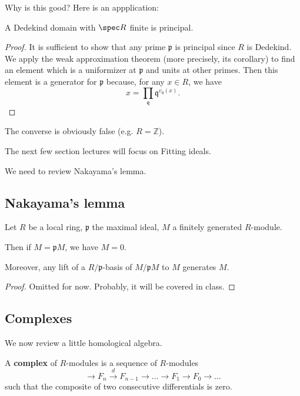 Why is this good? Here is an appplication:
\begin{theorem} 
A Dedekind domain with $\spec R$ finite is principal.
\end{theorem} 
\begin{proof} 
It is sufficient to show that any prime $\mathfrak{p}$ is principal since $R$
is Dedekind. We apply the weak approximation theorem (more precisely, its
corollary) to find an element which
is a uniformizer at $\mathfrak{p}$ and units at other primes. Then this element
is a generator for $\mathfrak{p}$ because, for any $x \in R$, we have
\[ x = \prod_{\mathfrak{q}} \mathfrak{q}^{v_{\mathfrak{q}}(x)}.  \]
\end{proof} 
The converse is obviously false (e.g.  $R  = \mathbb{Z}$).




The next few section lectures will focus on Fitting ideals.

We  need to review Nakayama's lemma.

\subsection{Nakayama's lemma}

\begin{lemma}[Nakayama] Let $R$ be a local ring, $\mathfrak{p}$ the maximal
ideal, $M$ a finitely generated $R$-module.

Then if $M = \mathfrak{p}M$, we have $M = 0$.

Moreover, any lift of a $R/\mathfrak{p}$-basis of $M/\mathfrak{p}M$ to $M$
generates $M$.
\end{lemma} 

\begin{proof} 
Omitted for now. Probably, it will be covered in class.
\end{proof} 

\subsection{Complexes}

We now review  a little homological algebra.

\begin{definition} 
A \textbf{complex} of $R$-modules is a sequence of $R$-modules
\[ \to F_n \stackrel{d}{\to} F_{n-1} \to \dots \to F_1 \to F_0 \to \dots  \]
such that the composite of two consecutive differentials is zero. 
\end{definition} 


